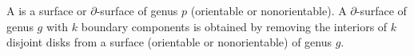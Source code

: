 A  is a surface or $\partial$-surface of genus $p$ (orientable or nonorientable). A $\partial$-surface of genus $g$ with $k$ boundary components is obtained by removing the interiors of $k$ disjoint disks from a surface (orientable or nonorientable) of genus $g$.
